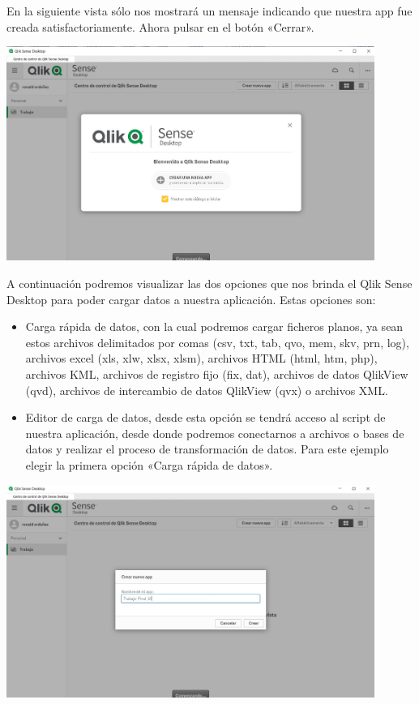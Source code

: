 En la siguiente vista sólo nos mostrará un mensaje indicando que nuestra app fue creada satisfactoriamente. Ahora pulsar en el botón «Cerrar».
\begin{center}
	\includegraphics[width=12cm]{./Imagenes/img8} 
\end{center}

A continuación podremos visualizar las dos opciones que nos brinda el Qlik Sense Desktop para poder cargar datos a nuestra aplicación. Estas opciones son:

\begin{itemize}
		\item Carga rápida de datos, con la cual podremos cargar ficheros planos, ya sean estos archivos delimitados por comas (csv, txt, tab, qvo, mem, skv, prn, log), archivos excel (xls, xlw, xlsx, xlsm), archivos HTML (html, htm, php), archivos KML, archivos de registro fijo (fix, dat), archivos de datos QlikView (qvd), archivos de intercambio de datos QlikView (qvx) o archivos XML.
		\item Editor de carga de datos, desde esta opción se tendrá acceso al script de nuestra aplicación, desde donde podremos conectarnos a archivos o bases de datos y realizar el proceso de transformación de datos.
Para este ejemplo elegir la primera opción «Carga rápida de datos».
\end{itemize}


\begin{center}
	\includegraphics[width=12cm]{./Imagenes/img9} 
\end{center}


